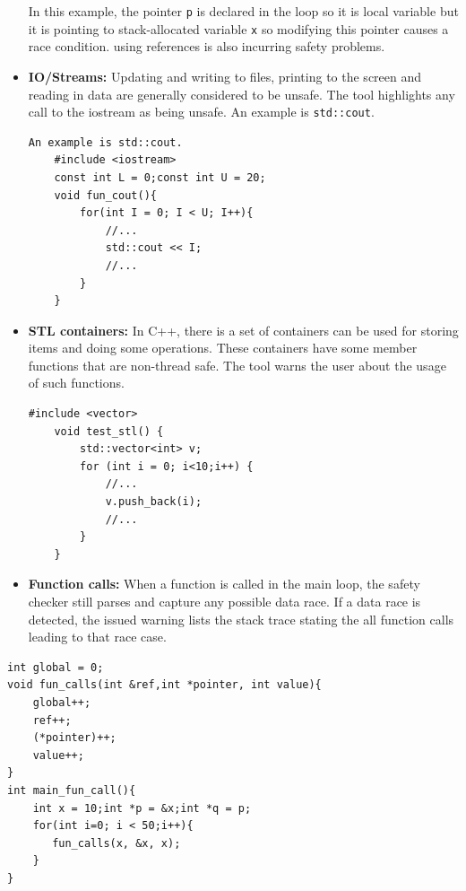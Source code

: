 \begin{itemize}
In this example, the pointer \texttt{p} is declared in the loop so it is local variable but it is pointing to stack-allocated variable \texttt{x} so modifying this pointer causes a race condition. using references is also incurring safety problems.

\item \textbf{IO/Streams:} Updating and writing to files, printing to the screen and reading in data are generally considered to be unsafe. The tool highlights any call to the iostream as being unsafe. An example is \texttt{std::cout}.

\begin{lstlisting}[label=code:filtering_generated,caption={IO/Streams}]
An example is std::cout.
    #include <iostream>
    const int L = 0;const int U = 20;
    void fun_cout(){
        for(int I = 0; I < U; I++){
            //...
            std::cout << I;
            //...
        }
    }
\end{lstlisting}

\item \textbf{STL containers:} In C++, there is a set of containers can be used for storing items and doing some operations. These containers have some member functions that are non-thread safe. The tool warns the user about the usage of such functions.

\begin{lstlisting}[label=code:filtering_generated,caption={STL Containers}]
#include <vector>
    void test_stl() {
        std::vector<int> v;
        for (int i = 0; i<10;i++) {
            //...
            v.push_back(i);
            //...
        }
    }
\end{lstlisting}

\item \textbf{Function calls:} When a function is called in the main loop, the safety checker still parses and capture any possible data race. If a data race is detected, the issued warning lists the stack trace stating the all function calls leading to that race case.	
\end{itemize}

\begin{lstlisting}[label=code:filtering_generated,caption={Function Calls}]
int global = 0;
void fun_calls(int &ref,int *pointer, int value){
    global++;
    ref++;
    (*pointer)++;
    value++;
}
int main_fun_call(){
    int x = 10;int *p = &x;int *q = p;
    for(int i=0; i < 50;i++){
       fun_calls(x, &x, x);
    }
}
\end{lstlisting}    
   
